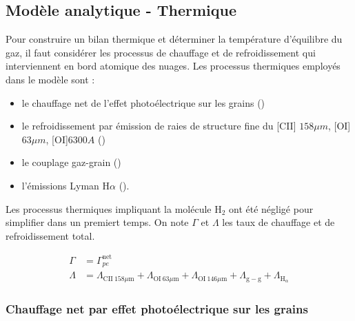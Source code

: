 
\subsection{Modèle analytique - Thermique}

Pour construire un bilan thermique et déterminer la température d'équilibre du gaz, il faut considérer les processus de chauffage et de refroidissement qui interviennent en bord atomique des nuages. Les processus thermiques employés dans le modèle sont :

\begin{itemize}
    \item le chauffage net de l'effet photoélectrique sur les grains (\cite{BakesTielens1994})
    \item le refroidissement par émission de raies de structure fine du [CII] $158 \mu m$,  [OI]$63 \mu m$, [OI]$6300A$ (\cite{Rollig2005})
    \item le couplage gaz-grain (\cite{Hollenbach1991})
    \item l'émissions Lyman $\mathrm{H}\alpha$ (\cite{tielens2005}).
\end{itemize}{}

Les processus thermiques impliquant la molécule $\mathrm{H}_2$ ont été négligé pour simplifier dans un premiert temps.
On note $\Gamma$ et $\Lambda$ les taux de chauffage et de refroidissement total.

\begin{equation}
    \begin{split}
        \Gamma &= \Gamma_{pe}^{\mathrm{net}} \\
        \Lambda &=   \Lambda_{\mathrm{CII}\ 158 \mu \mathrm{m}} + \Lambda_{\mathrm{OI}\ 63 \mu \mathrm{m}} + \Lambda_{\mathrm{OI}\ 146 \mu \mathrm{m}}  + \Lambda_{\mathrm{g}-\mathrm{g}} + \Lambda_{\mathrm{H}_\alpha}
    \end{split}
\end{equation}


\subsubsection{Chauffage net par effet photoélectrique sur les grains}

